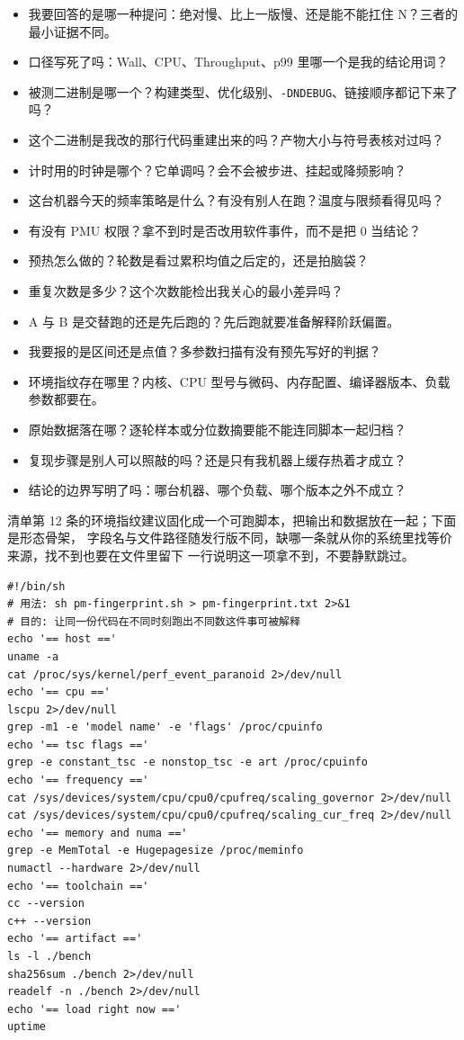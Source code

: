 \documentclass[12pt,a4paper,fontset=fandol]{ctexbook}
\newcommand{\Tp}[1]{\texttt{#1}}
\newcommand{\Lang}[1]{\textsf{#1}}
\newcommand{\MWall}{\Lang{Wall}}
\newcommand{\MCpu}{\Lang{CPU}}
\newcommand{\MThr}{\Lang{Throughput}}
\newcommand{\Mx}[1]{\textsf{#1}}
\begin{document}
\begin{itemize}
  \item 我要回答的是哪一种提问：绝对慢、比上一版慢、还是能不能扛住 N？三者的最小证据不同。
  \item 口径写死了吗：\MWall、\MCpu、\MThr、\Mx{p99} 里哪一个是我的结论用词？
  \item 被测二进制是哪一个？构建类型、优化级别、\Tp{-DNDEBUG}、链接顺序都记下来了吗？
  \item 这个二进制是我改的那行代码重建出来的吗？产物大小与符号表核对过吗？
  \item 计时用的时钟是哪个？它单调吗？会不会被步进、挂起或降频影响？
  \item 这台机器今天的频率策略是什么？有没有别人在跑？温度与限频看得见吗？
  \item 有没有 PMU 权限？拿不到时是否改用软件事件，而不是把 0 当结论？
  \item 预热怎么做的？轮数是看过累积均值之后定的，还是拍脑袋？
  \item 重复次数是多少？这个次数能检出我关心的最小差异吗？
  \item A 与 B 是交替跑的还是先后跑的？先后跑就要准备解释阶跃偏置。
  \item 我要报的是区间还是点值？多参数扫描有没有预先写好的判据？
  \item 环境指纹存在哪里？内核、CPU 型号与微码、内存配置、编译器版本、负载参数都要在。
  \item 原始数据落在哪？逐轮样本或分位数摘要能不能连同脚本一起归档？
  \item 复现步骤是别人可以照敲的吗？还是只有我机器上缓存热着才成立？
  \item 结论的边界写明了吗：哪台机器、哪个负载、哪个版本之外不成立？
\end{itemize}

清单第 12 条的环境指纹建议固化成一个可跑脚本，把输出和数据放在一起；下面是形态骨架，
字段名与文件路径随发行版不同，缺哪一条就从你的系统里找等价来源，找不到也要在文件里留下
一行说明这一项拿不到，不要静默跳过。

\begin{lstlisting}[style=shellstyle,caption={环境指纹采集骨架（可跑；字段随发行版与内核变，不含任何实测值）},label={lst:pmapC-fingerprint}]
#!/bin/sh
# 用法: sh pm-fingerprint.sh > pm-fingerprint.txt 2>&1
# 目的: 让同一份代码在不同时刻跑出不同数这件事可被解释
echo '== host =='
uname -a
cat /proc/sys/kernel/perf_event_paranoid 2>/dev/null
echo '== cpu =='
lscpu 2>/dev/null
grep -m1 -e 'model name' -e 'flags' /proc/cpuinfo
echo '== tsc flags =='
grep -e constant_tsc -e nonstop_tsc -e art /proc/cpuinfo
echo '== frequency =='
cat /sys/devices/system/cpu/cpu0/cpufreq/scaling_governor 2>/dev/null
cat /sys/devices/system/cpu/cpu0/cpufreq/scaling_cur_freq 2>/dev/null
echo '== memory and numa =='
grep -e MemTotal -e Hugepagesize /proc/meminfo
numactl --hardware 2>/dev/null
echo '== toolchain =='
cc --version
c++ --version
echo '== artifact =='
ls -l ./bench
sha256sum ./bench 2>/dev/null
readelf -n ./bench 2>/dev/null
echo '== load right now =='
uptime
\end{lstlisting}
\end{document}
